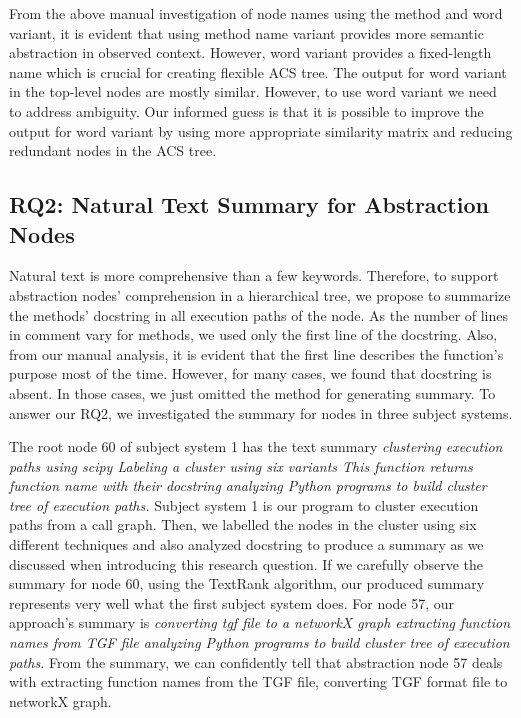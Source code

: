 From the above manual investigation of node names using the method and word variant, it is evident that using method name variant provides more semantic abstraction in observed context. However, word variant provides a fixed-length name which is crucial for creating flexible ACS tree. The output for word variant in the top-level nodes are mostly similar. However, to use word variant we need to address ambiguity. Our informed guess is that it is possible to improve the output for word variant by using more appropriate similarity matrix and reducing redundant nodes in the ACS tree.


\subsection{ RQ2: Natural Text Summary for Abstraction Nodes}
 Natural text is more comprehensive than a few keywords. Therefore, to support abstraction nodes' comprehension in a hierarchical tree, we propose to summarize the methods' docstring in all execution paths of the node. As the number of lines in comment vary for methods,  we used only the first line of the docstring. Also, from our manual analysis, it is evident that the first line describes the function's purpose most of the time. However, for many cases, we found that docstring is absent. In those cases, we just omitted the method for generating summary. To answer our RQ2, we investigated the summary for nodes in three subject systems. 
 
 The root node 60 of subject system 1 has the text summary \textit{clustering execution paths using scipy Labeling a cluster using six variants  This function returns function name with their docstring  analyzing Python programs to build cluster tree of execution paths.} Subject system 1 is our program to cluster execution paths from a call graph. Then, we labelled the nodes in the cluster using six different techniques and also analyzed docstring to produce a summary as we discussed when introducing this research question. If we carefully observe the summary for node 60, using the TextRank algorithm, our produced summary represents very well what the first subject system does. For node 57, our approach's summary is \textit{converting tgf file to a networkX graph extracting function names from TGF file analyzing Python programs to build cluster tree of execution paths.} From the summary, we can confidently tell that abstraction node 57 deals with extracting function names from the TGF file, converting TGF format file to networkX graph.
 
